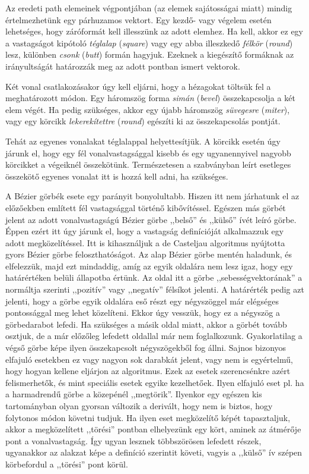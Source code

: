 \documentclass[12pt]{report}
\theoremstyle{definition}
\newcommand{\inenglish}[1]{\textsl{#1}}
\begin{document}
Az eredeti path elemeinek végpontjában (az elemek sajátosságai miatt) mindig
értelmezhetünk egy párhuzamos vektort. Egy kezdő- vagy végelem esetén
lehetséges, hogy záróformát kell illesszünk az adott elemhez. Ha kell, akkor ez
egy a vastagságot kipótoló \emph{téglalap} (\inenglish{square}) vagy egy abba
illeszkedő \emph{félkör} (\inenglish{round}) lesz, különben \emph{csonk}
(\inenglish{butt}) formán hagyjuk. Ezeknek a kiegészítő formáknak az
irányultságát határozzák meg az adott pontban ismert vektorok.

Két vonal csatlakozásakor úgy kell eljárni, hogy a hézagokat töltsük fel a
meghatározott módon. Egy háromszög forma \emph{simán} (\inenglish{bevel})
összekapcsolja a két elem végét. Ha pedig szükséges, akkor egy újabb háromszög
\emph{süvegesre} (\inenglish{miter}), vagy egy körcikk \emph{lekerekítettre}
(\inenglish{round}) egészíti ki az összekapcsolás pontját.

Tehát az egyenes vonalakat téglalappal helyettesítjük. A körcikk esetén úgy
járunk el, hogy egy fél vonalvastagsággal kisebb és egy ugyanennyivel nagyobb
körcikket a végeiknél összekötünk. Természetesen a szabványban leírt esetleges
összekötő egyenes vonalat itt is hozzá kell adni, ha szükséges.

A Bézier görbék esete egy parányit bonyolultabb. Hiszen itt nem járhatunk el az
előzőekben említett fél vastagsággal történő kibővítéssel. Egészen más görbét
jelent az adott vonalvastagságú Bézier görbe ,,belső'' és ,,külső'' ívét leíró
görbe. Éppen ezért itt úgy járunk el, hogy a vastagság definícióját alkalmazzuk
egy adott megközelítéssel. Itt is kihasználjuk a de Casteljau algoritmus
nyújtotta gyors Bézier görbe feloszthatóságot. Az alap Bézier görbe mentén
haladunk, és elfelezzük, majd ezt mindaddig, amíg az egyik oldalára nem lesz
igaz, hogy egy határértéken belüli állapotba értünk. Az oldal itt a görbe
,,sebességvektorának'' a normáltja szerinti ,,pozitív'' vagy ,,negatív''
félsíkot jelenti. A határérték pedig azt jelenti, hogy a görbe egyik oldalára
eső részt egy négyszöggel már elégséges pontossággal meg lehet közelíteni.
Ekkor úgy vesszük, hogy ez a négyszög a görbedarabot lefedi. Ha szükséges a
másik oldal miatt, akkor a görbét tovább osztjuk, de a már előzőleg lefedett
oldallal már nem foglalkozunk. Gyakorlatilag a végső görbe képe ilyen
összekapcsolt négyszögekből fog állni. Sajnos bizonyos elfajuló esetekben ez
vagy nagyon sok darabkát jelent, vagy nem is egyértelmű, hogy hogyan kellene
eljárjon az algoritmus. Ezek az esetek szerencsénkre azért felismerhetők, és
mint speciális esetek egyike kezelhetőek. Ilyen elfajuló eset pl. ha a
harmadrendű görbe a közepénél ,,megtörik''. Ilyenkor egy egészen kis
tartományban olyan gyorsan változik a derivált, hogy nem is biztos, hogy
folytonos módon követni tudjuk. Ha ilyen eset megközelítő képét tapasztaljuk,
akkor a megközelített ,,törési'' pontban elhelyezünk egy kört, aminek az
átmérője pont a vonalvastagság. Így ugyan lesznek többszörösen lefedett részek,
ugyanakkor az alakzat képe a definíció szerintit követi, vagyis a ,,külső'' ív
szépen körbefordul a ,,törési'' pont körül.
\end{document}
